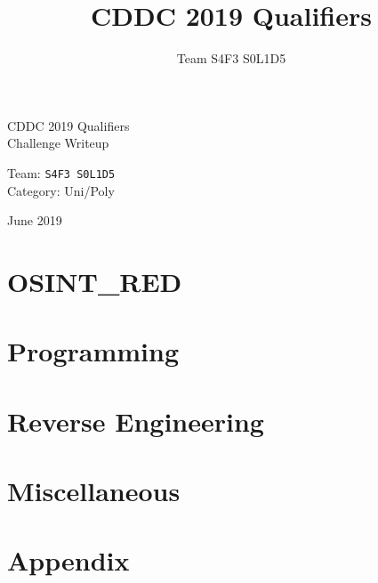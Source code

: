 \documentclass[12pt]{article}
\title{CDDC 2019 Qualifiers}
\author{Team S4F3 S0L1D5}
\begin{document}
\hypersetup{pageanchor=false}
\begin{center}

	\vspace*{5mm}

	\begin{flushleft}

	{
		\Roboto\fontsize{36pt}{48pt}\selectfont CDDC 2019 Qualifiers \\
		\Roboto\fontsize{28pt}{40pt}\selectfont Challenge Writeup

		\vfill

		\normalfont\fontsize{20pt}{24pt}\selectfont Team:    \tabto{30mm} \fontsize{24pt}{24pt}\selectfont \texttt{S4F3 S0L1D5} \\
		\normalfont\fontsize{20pt}{24pt}\selectfont Category:\tabto{30mm} Uni/Poly

		\vspace{5mm}
		\normalfont\fontsize{16pt}{20pt}\selectfont June 2019
		\vspace{30mm}
	}

	\end{flushleft}


\end{center}


\pagebreak
{}
\hypersetup{pageanchor=true}


\pagebreak\part{OSINT\_RED}


\pagebreak\part{Programming}


\pagebreak\part{Reverse Engineering}


\pagebreak\part{Miscellaneous}




\makeatletter{}\makeatother
\pagebreak\part{Appendix}
\end{document}
